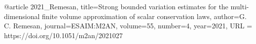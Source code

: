 @article{
      2021_Remesan,
	title={Strong bounded variation estimates for the multi-dimensional finite volume approximation of scalar conservation laws},
	author={G. C.  Remesan},
	journal={ESAIM:M2AN},
	volume={55},
	number={4},
	year={2021},
	URL = {https://doi.org/10.1051/m2an/2021027}
}